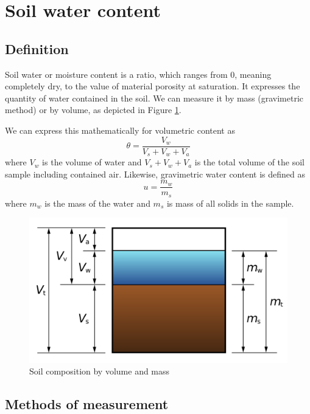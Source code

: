 
\section{Soil water content}

\subsection{Definition}
Soil water or moisture content is a ratio, which ranges from 0, meaning completely dry, to the value of material porosity at saturation. It expresses the quantity of water contained in the soil. We can measure it by mass (gravimetric method) or by volume, as depicted in Figure \ref{fig:soil-phase-diagram}. 

We can express this mathematically for volumetric content as
\begin{equation}
    \label{equation:volumetric-content} \theta = \dfrac{V_w}{V_s + V_w + V_a}
\end{equation}
where $V_w$ is the volume of water and $V_s + V_w + V_a$ is the total volume of the soil sample including contained air. Likewise, gravimetric water content is defined as
\begin{equation}
    \label{equation:gravimetric-content} u = \dfrac{m_w}{m_s}
\end{equation}
where $m_w$ is the mass of the water and $m_s$ is mass of all solids in the sample.

\begin{figure}
    \includegraphics[width=.8\textwidth]{fig/soil-phase-diagram.png}
    \caption{\label{fig:soil-phase-diagram} Soil composition by volume and mass}
\end{figure}

\subsection{Methods of measurement}
